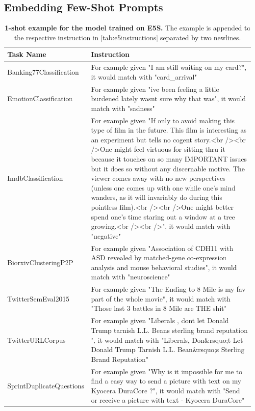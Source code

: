 \documentclass{article}
\begin{document}
\subsection{Embedding Few-Shot Prompts}
\label{sec:promptsembfewshot}

\setlength\extrarowheight{5pt}
\begin{longtable}{lp{9cm}}
\caption{\textbf{1-shot example for the model trained on E5S.} The example is appended to the respective instruction in \autoref{tab:e5instructions} separated by two newlines.}\\
\toprule
Task Name & Instruction \\
\midrule
Banking77Classification & For example given "I am still waiting on my card?", it would match with "card\_arrival"\\
EmotionClassification & For example given "ive been feeling a little burdened lately wasnt sure why that was", it would match with "sadness"\\
ImdbClassification & For example given "If only to avoid making this type of film in the future. This film is interesting as an experiment but tells no cogent story.<br /><br />One might feel virtuous for sitting thru it because it touches on so many IMPORTANT issues but it does so without any discernable motive. The viewer comes away with no new perspectives (unless one comes up with one while one's mind wanders, as it will invariably do during this pointless film).<br /><br />One might better spend one's time staring out a window at a tree growing.<br /><br />", it would match with "negative"\\
\midrule
BiorxivClusteringP2P & For example given "Association of CDH11 with ASD revealed by matched-gene co-expression analysis and mouse behavioral studies", it would match with "neuroscience" \\
\midrule
TwitterSemEval2015 & For example given "The Ending to 8 Mile is my fav part of the whole movie", it would match with "Those last 3 battles in 8 Mile are THE shit" \\
TwitterURLCorpus & For example given "Liberals , dont let Donald Trump tarnish L.L. Beans sterling brand reputation ", it would match with "Liberals, Don\&rsquo;t Let Donald Trump Tarnish L.L. Bean\&rsquo;s Sterling Brand Reputation" \\
SprintDuplicateQuestions & For example given "Why is it impossible for me to find a easy way to send a picture with text on my Kyocera DuraCore ?", it would match with "Send or receive a picture with text - Kyocera DuraCore" \\

\end{longtable}
\end{document}
